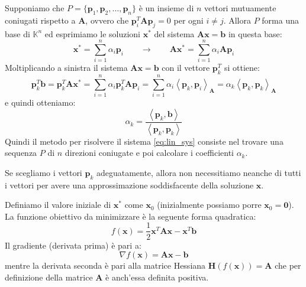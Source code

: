 \documentclass[10pt]{article}
\begin{document}
Supponiamo che $P=\{\mathbf{p}_1, \mathbf{p}_2, \ldots, \mathbf{p}_n\}$ è un insieme di $n$ vettori mutuamente coniugati rispetto a $\mathbf{A}$, ovvero che $\mathbf{p}_i^T\mathbf{A}\mathbf{p}_j=0$ per ogni $i\neq j$. Allora $P$ forma una base di $\mathbb{K}^n$ ed esprimiamo le soluzioni $\mathbf{x}^*$ del sistema $\mathbf{Ax}=\mathbf{b}$ in questa base:
\begin{equation}
\mathbf{x}^* = \sum_{i=1}^n \alpha_i \mathbf{p}_i
\qquad \rightarrow \qquad
\mathbf{A}\mathbf{x}^* = \sum_{i=1}^n \alpha_i \mathbf{A}\mathbf{p}_i
\end{equation}
Moltiplicando a sinistra il sistema $\mathbf{Ax}=\mathbf{b}$ con il vettore $\mathbf{p}_k^T$ si ottiene:
\begin{equation}
\mathbf{p}_k^T \mathbf{b} = \mathbf{p}_k^T \mathbf{A} \mathbf{x}^* = \sum_{i=1}^n \alpha_i \mathbf{p}_k^T \mathbf{A} \mathbf{p}_i = \sum_{i=1}^n \alpha_i \left<\mathbf{p}_k,\mathbf{p}_i\right>_\mathbf{A} = \alpha_k \left<\mathbf{p}_k,\mathbf{p}_k\right>_\mathbf{A}
\end{equation}
e quindi otteniamo:
\begin{equation}
\alpha_k = \frac{\left<\mathbf{p}_k,\mathbf{b}\right>}{\left<\mathbf{p}_k,\mathbf{p}_k\right>}
\end{equation}
Quindi il metodo per risolvere il sistema \eqref{eq:lin_sys} consiste nel trovare una sequenza $P$ di $n$ direzioni coniugate e poi calcolare i coefficienti $\alpha_k$.

Se scegliamo i vettori $\mathbf{p}_k$ adeguatamente, allora non necessitiamo neanche di tutti i vettori per avere una approssimazione soddisfacente della soluzione $\mathbf{x}$.

Definiamo il valore iniziale di $\mathbf{x}^*$ come $\mathbf{x}_0$ (inizialmente possiamo porre $\mathbf{x}_0=\mathbf{0}$).
La funzione obiettivo da minimizzare è la seguente forma quadratica:
\begin{equation}
f(\mathbf{x}) = \frac{1}{2} \mathbf{x}^T \mathbf{A} \mathbf{x} - \mathbf{x}^T \mathbf{b}
\end{equation}
Il gradiente (derivata prima) è pari a:
\begin{equation}
\nabla f(\mathbf{x}) = \mathbf{Ax}-\mathbf{b}
\end{equation}
mentre la derivata seconda è pari alla matrice Hessiana $\mathbf{H}(f(\mathbf{x})) = \mathbf{A}$ che per definizione della matrice $\mathbf{A}$ è anch'essa definita positiva.
\end{document}
